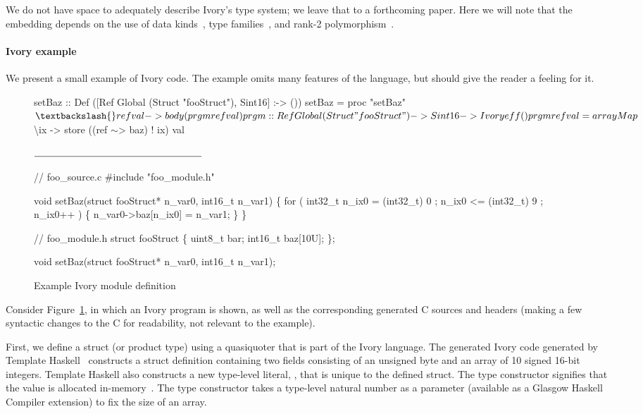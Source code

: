 We do not have space to adequately describe Ivory's type system; we leave that
to a forthcoming paper.  Here we will note that the embedding depends on the use
of data kinds~\cite{datakinds}, type families~\cite{typefamilies}, and rank-2
polymorphism~\cite{stmonad}.


\paragraph{Ivory example}
We present a small example of Ivory code.  The example omits many features of
the language, but should give the reader a feeling for it.

\begin{figure}
    \begin{smcode}

setBaz :: Def ([Ref Global (Struct "fooStruct"), Sint16] :-> ())
setBaz = proc "setBaz" $ \textbackslash{}ref val -> body (prgm ref val)

prgm :: Ref Global (Struct "fooStruct") -> Sint16 -> Ivory eff ()
prgm ref val = arrayMap $ \textbackslash{}ix ->
                 store ((ref \(\sim\)> baz) ! ix) val

\(\noindent\rule{6cm}{0.4pt}\)

// foo_source.c
#include "foo_module.h"

void setBaz(struct fooStruct* n_var0, int16_t n_var1) \{
  for ( int32_t n_ix0 = (int32_t) 0
      ; n_ix0 <= (int32_t) 9
      ; n_ix0++ ) \{
      n_var0->baz[n_ix0] = n_var1;
  \}
\}

// foo_module.h
struct fooStruct \{
    uint8_t bar;
    int16_t baz[10U];
\};

void setBaz(struct fooStruct* n_var0, int16_t n_var1);
\end{smcode}
  \caption{Example Ivory module definition}
  \label{fig:module}
\end{figure}

Consider Figure~\ref{fig:module}, in which an Ivory program is shown, as well as
the corresponding generated C sources and headers (making a few syntactic
changes to the C for readability, not relevant to the example).

First, we define a struct (or product type) using a quasiquoter that is part of
the Ivory language.  The generated Ivory code generated by Template
Haskell~\cite{th} constructs a struct definition containing two fields
consisting of an unsigned byte and an array of 10 signed 16-bit integers.
Template Haskell also constructs a new type-level literal, ,
that is unique to the defined struct.  The  type constructor
signifies that the value is allocated in-memory~\cite{memareas}.  The 
type constructor takes a type-level natural number as a parameter (available as
a Glasgow Haskell Compiler extension) to fix the size of an array.

